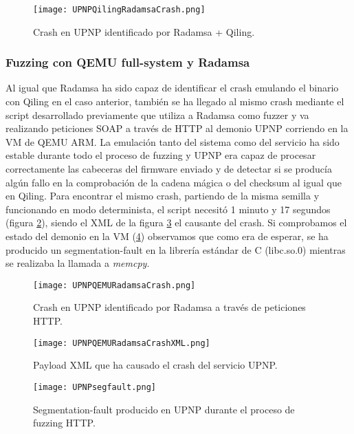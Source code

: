 \begin{figure}[H]
    \centering
    \texttt{[image: UPNPQilingRadamsaCrash.png]}
    \caption{Crash en UPNP identificado por Radamsa + Qiling.}
    \label{fig:UPNPQilingRadamsaCrash}
\end{figure}

\subsubsection{Fuzzing con QEMU full-system y Radamsa}
Al igual que Radamsa ha sido capaz de identificar el crash emulando el binario con Qiling en el caso anterior, también se ha llegado al mismo 
crash mediante el script desarrollado previamente que utiliza a Radamsa como fuzzer y va realizando peticiones SOAP a través de HTTP al 
demonio UPNP corriendo en la VM de QEMU ARM. La emulación tanto del sistema como del servicio ha sido estable durante todo el proceso de
fuzzing y UPNP era capaz de procesar correctamente las cabeceras del firmware enviado y de detectar si se producía algún fallo en la comprobación
de la cadena mágica o del checksum al igual que en Qiling. Para encontrar el mismo crash, partiendo de la misma semilla y funcionando en modo 
determinista, el script necesitó 1 minuto y 17 segundos (figura \ref{fig:UPNPQEMURadamsaCrash}), siendo el XML de la figura \ref{fig:UPNPQEMURadamsaCrashXML}
el causante del crash. Si comprobamos el estado del demonio en la VM (\ref{fig:UPNPsegfault}) observamos que como era de esperar, se ha producido un segmentation-fault
en la librería estándar de C (libc.so.0) mientras se realizaba la llamada a \textit{memcpy}.

\begin{figure}[H]
    \centering
    \texttt{[image: UPNPQEMURadamsaCrash.png]}
    \caption{Crash en UPNP identificado por Radamsa a través de peticiones HTTP.}
    \label{fig:UPNPQEMURadamsaCrash}
\end{figure}

\begin{figure}[H]
    \centering
    \texttt{[image: UPNPQEMURadamsaCrashXML.png]}
    \caption{Payload XML que ha causado el crash del servicio UPNP.}
    \label{fig:UPNPQEMURadamsaCrashXML}
\end{figure}

\begin{figure}[H]
    \centering
    \texttt{[image: UPNPsegfault.png]}
    \caption{Segmentation-fault producido en UPNP durante el proceso de fuzzing HTTP.}
    \label{fig:UPNPsegfault}
\end{figure}

